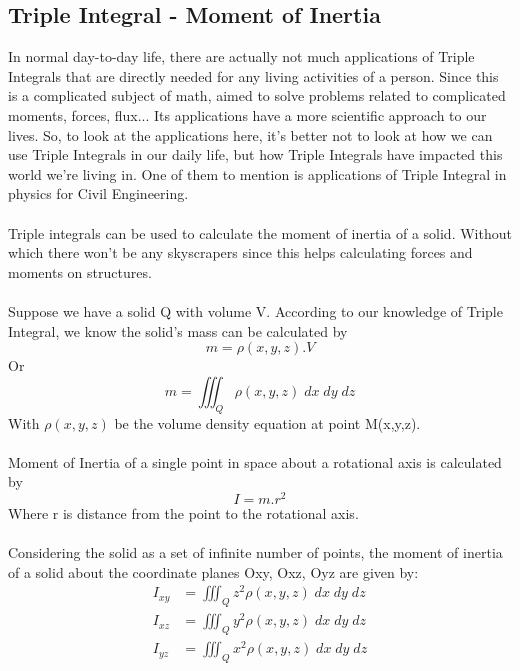\documentclass[a4paper]{article}
\begin{document}
\subsection{Triple Integral - Moment of Inertia }
In normal day-to-day life, there are actually not much applications of Triple Integrals that are directly needed for any living activities of a person. Since this is a complicated subject of math, aimed to solve problems related to complicated moments, forces, flux... Its applications have a more scientific approach to our lives. So, to look at the applications here, it's better not to look at how we can use Triple Integrals in our daily life, but how Triple Integrals have impacted this world we're living in. One of them to mention is applications of Triple Integral in physics for Civil Engineering.\\\\  
Triple integrals can be used to calculate the moment of inertia of a solid. Without which there won't be any skyscrapers since this helps calculating forces and moments on structures.\\\\
Suppose we have a solid Q with volume V. According to our knowledge of Triple Integral, we know the solid's mass can be calculated by 
\begin{equation}
	m = \rho(x,y,z).V 
\end{equation}
Or
\begin{equation}
	m=\iiint_Q \rho(x,y,z)\;dx\;dy\;dz
\end{equation}
With $\rho(x,y,z)$ be the volume density equation at point M(x,y,z).\\\\
Moment of Inertia of a single point in space about a rotational axis is calculated by
\begin{equation}
	I = m.r^2
\end{equation}
Where r is distance from the point to the rotational axis.\\\\
Considering the solid as a set of infinite number of points, the moment of inertia of a solid about the coordinate planes Oxy, Oxz, Oyz are given by:\\
\begin{align*}
	I_{xy} & = \iiint_Q z^2 \rho(x,y,z)\;dx\;dy\;dz \\
	I_{xz} & = \iiint_Q y^2 \rho(x,y,z)\;dx\;dy\;dz \\
	I_{yz} & = \iiint_Q x^2 \rho(x,y,z)\;dx\;dy\;dz \\
\end{align*}
\end{document}
